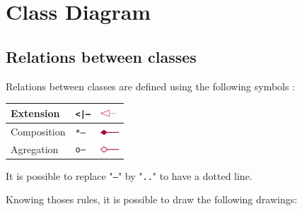 %
%
% 
%
%
%
%
%
% 

\section{Class Diagram}

\subsection{Relations between classes}

\begin{description}
\item Relations between classes are defined using the following symbols : 

\begin{tabular}{|l|l|l|} \hline
Extension & \texttt{<|--} & 
\includegraphics[width=6mm]{img/extends01.png}

\\ \hline
Composition & \texttt{*--} &
\includegraphics[width=7mm]{img/sym03.png}

\\ \hline
Agregation & \texttt{o--} &
\includegraphics[width=7mm]{img/sym01.png}

\\ \hline
\end{tabular}

\item It is possible to replace "\texttt{--}" by "\texttt{..}" to have a dotted
line.

\item Knowing thoses rules, it is possible to draw the following drawings: 
\end{description}

